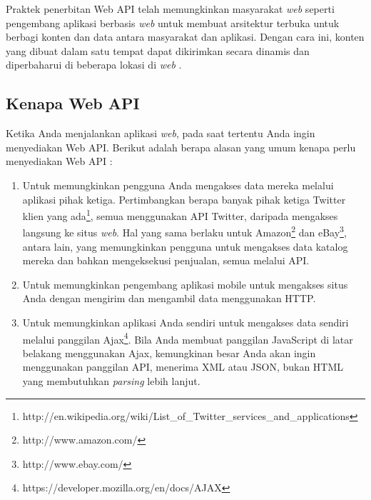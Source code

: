 \documentclass[a4paper, 12pt]{report}
\begin{document}
\onehalfspacing Praktek penerbitan Web API telah memungkinkan masyarakat \textit{web} seperti pengembang aplikasi berbasis \textit{web} untuk membuat arsitektur terbuka untuk berbagi konten dan data antara masyarakat dan aplikasi. Dengan cara ini, konten yang dibuat dalam satu tempat dapat dikirimkan secara dinamis dan diperbaharui di beberapa lokasi di \textit{web} \cite{api-wikipedia}.

\subsection{Kenapa Web API}
Ketika Anda menjalankan aplikasi \textit{web}, pada saat tertentu Anda ingin menyediakan Web API. Berikut adalah berapa alasan yang umum kenapa perlu menyediakan Web API \cite{apis-linux-journal}:

\begin{enumerate}
  \item Untuk memungkinkan pengguna Anda mengakses data mereka melalui aplikasi pihak ketiga. Pertimbangkan berapa banyak pihak ketiga Twitter klien yang ada\footnote{http://en.wikipedia.org/wiki/List\_of\_Twitter\_services\_and\_applications}, semua menggunakan API Twitter, daripada mengakses langsung ke situs \textit{web}. Hal yang sama berlaku untuk Amazon\footnote{http://www.amazon.com/} dan eBay\footnote{http://www.ebay.com/}, antara lain, yang memungkinkan pengguna untuk mengakses data katalog mereka dan bahkan mengeksekusi penjualan, semua melalui API.
  \item Untuk memungkinkan pengembang aplikasi mobile untuk mengakses situs Anda dengan mengirim dan mengambil data menggunakan HTTP.
  \item Untuk memungkinkan aplikasi Anda sendiri untuk mengakses data sendiri melalui panggilan Ajax\footnote{https://developer.mozilla.org/en/docs/AJAX}. Bila Anda membuat panggilan JavaScript di latar belakang menggunakan Ajax, kemungkinan besar Anda akan ingin menggunakan panggilan API, menerima XML atau JSON, bukan HTML yang membutuhkan \textit{parsing} lebih lanjut.
\end{enumerate}
\end{document}

